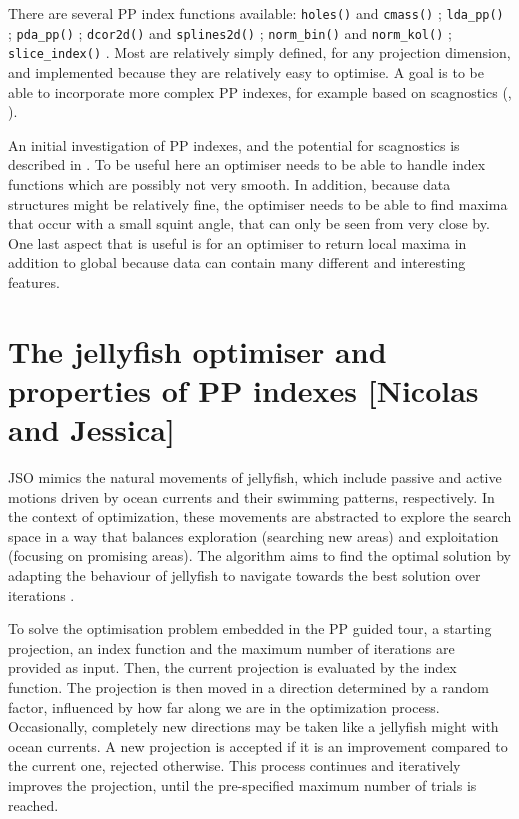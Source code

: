 \documentclass[
  number,
  preprint,
  3p]{elsarticle}
\begin{document}
There are several PP index functions available: \texttt{holes()} and
\texttt{cmass()} \citep{cook1993projection}; \texttt{lda\_pp()}
\citep{lee2005projection}; \texttt{pda\_pp()} \citep{lee2010projection};
\texttt{dcor2d()} and \texttt{splines2d()} \citep{Grimm2016};
\texttt{norm\_bin()} and \texttt{norm\_kol()} \citep{huber85};
\texttt{slice\_index()} \citep{Laa:2020wkm}. Most are relatively simply
defined, for any projection dimension, and implemented because they are
relatively easy to optimise. A goal is to be able to incorporate more
complex PP indexes, for example based on scagnostics (\citet{scag},
\citet{WW08}).

An initial investigation of PP indexes, and the potential for
scagnostics is described in \citet{laa_using_2020}. To be useful here an
optimiser needs to be able to handle index functions which are possibly
not very smooth. In addition, because data structures might be
relatively fine, the optimiser needs to be able to find maxima that
occur with a small squint angle, that can only be seen from very close
by. One last aspect that is useful is for an optimiser to return local
maxima in addition to global because data can contain many different and
interesting features.

\section{The jellyfish optimiser and properties of PP indexes {[}Nicolas
and Jessica{]}}\label{sec-theory}

JSO mimics the natural movements of jellyfish, which include passive and
active motions driven by ocean currents and their swimming patterns,
respectively. In the context of optimization, these movements are
abstracted to explore the search space in a way that balances
exploration (searching new areas) and exploitation (focusing on
promising areas). The algorithm aims to find the optimal solution by
adapting the behaviour of jellyfish to navigate towards the best
solution over iterations \citep{chou_novel_2021}.

To solve the optimisation problem embedded in the PP guided tour, a
starting projection, an index function and the maximum number of
iterations are provided as input. Then, the current projection is
evaluated by the index function. The projection is then moved in a
direction determined by a random factor, influenced by how far along we
are in the optimization process. Occasionally, completely new directions
may be taken like a jellyfish might with ocean currents. A new
projection is accepted if it is an improvement compared to the current
one, rejected otherwise. This process continues and iteratively improves
the projection, until the pre-specified maximum number of trials is
reached.
\end{document}
